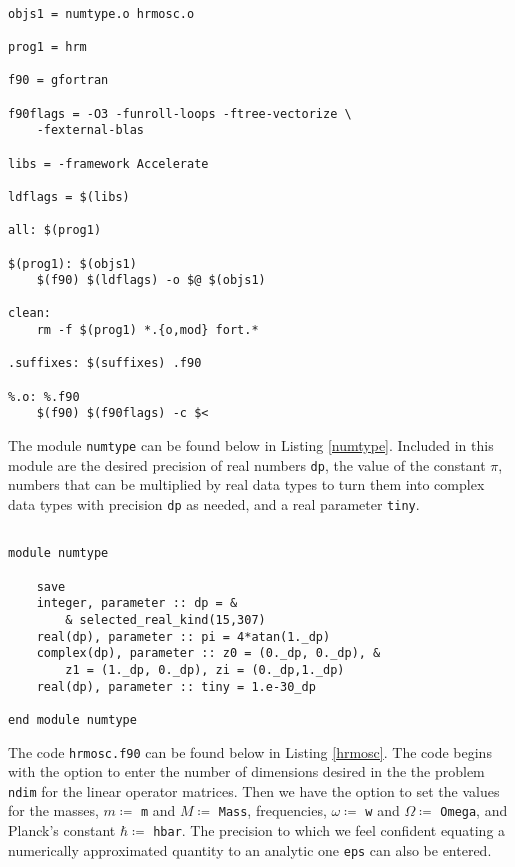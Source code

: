 \documentclass[12pt]{article}
\begin{document}
\begin{lstlisting}[frame=single,caption={{\tt Makefile}},label=makefile]

objs1 = numtype.o hrmosc.o

prog1 = hrm

f90 = gfortran

f90flags = -O3 -funroll-loops -ftree-vectorize \ 
    -fexternal-blas

libs = -framework Accelerate

ldflags = $(libs)

all: $(prog1)

$(prog1): $(objs1)
	$(f90) $(ldflags) -o $@ $(objs1)

clean: 
	rm -f $(prog1) *.{o,mod} fort.*

.suffixes: $(suffixes) .f90

%.o: %.f90
	$(f90) $(f90flags) -c $<

\end{lstlisting}

The module {\tt numtype} can be found below in Listing \ref{numtype}.  Included in this module are the desired precision of real numbers {\tt dp}, the value of the constant $\pi$, numbers that can be multiplied by real data types to turn them into complex data types with precision {\tt dp} as needed, and a real parameter {\tt tiny}.

\begin{lstlisting}[frame=single,caption={{\tt Fortran 90} Module {\tt numtype.f90}},label=numtype]

module numtype

    save
    integer, parameter :: dp = &
        & selected_real_kind(15,307)
    real(dp), parameter :: pi = 4*atan(1._dp)
    complex(dp), parameter :: z0 = (0._dp, 0._dp), &
        z1 = (1._dp, 0._dp), zi = (0._dp,1._dp)
    real(dp), parameter :: tiny = 1.e-30_dp

end module numtype

\end{lstlisting}

The code {\tt hrmosc.f90} can be found below in Listing \ref{hrmosc}.  The code begins with the option to enter the number of dimensions desired in the the problem {\tt ndim} for the linear operator matrices.  Then we have the option to set the values for the masses, $m\coloneqq$ {\tt m} and $M\coloneqq$ {\tt Mass}, frequencies, $\omega\coloneqq$ {\tt w} and $\Omega\coloneqq$ {\tt Omega}, and Planck's constant $\hbar\coloneqq$ {\tt hbar}.  The precision to which we feel confident equating a numerically approximated quantity to an analytic one {\tt eps} can also be entered.  
\end{document}
